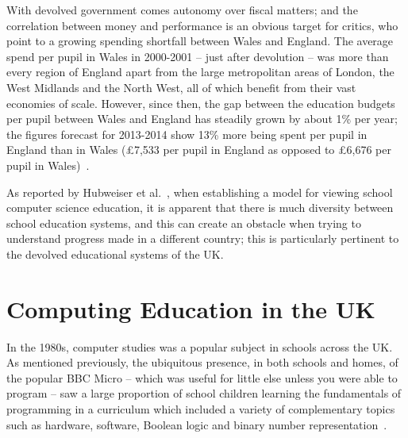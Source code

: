 \documentclass{sig-alternate}
\begin{document}
With devolved government comes autonomy over fiscal matters; and the
correlation between money and performance is an obvious target for
critics, who point to a growing spending shortfall between Wales and
England.  The average spend per pupil in Wales in 2000-2001 -- just
after devolution -- was more than every region of England apart from
the large metropolitan areas of London, the West Midlands and the
North West, all of which benefit from their vast economies of scale.
However, since then, the gap between the education budgets per pupil
between Wales and England has steadily grown by about 1\% per year;
the figures forecast for 2013-2014 show 13\% more being spent per
pupil in England than in Wales (\pounds7,533 per pupil in England as
opposed to \pounds6,676 per pupil in Wales)~\cite{Evans:2015}.

As reported by Hubweiser et al.~\cite{hubwieser-et-al:2011}, when
establishing a model for viewing school computer science education, it
is apparent that there is much diversity between school education
systems, and this can create an obstacle when trying to understand
progress made in a different country; this is particularly pertinent
to the devolved educational systems of the UK.

\section{Computing Education in the UK}\label{compedu}

In the 1980s, computer studies was a popular subject in schools across
the UK. As mentioned previously, the ubiquitous presence, in both
schools and homes, of the popular BBC Micro -- which was useful for
little else unless you were able to program -- saw a large proportion
of school children learning the fundamentals of programming in a
curriculum which included a variety of complementary topics such as
hardware, software, Boolean logic and binary number
representation~\cite{Doyle:1988}.
\end{document}

